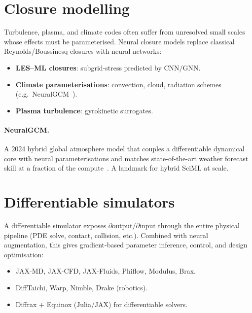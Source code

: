 \section{Closure modelling}
Turbulence, plasma, and climate codes often suffer from unresolved
small scales whose effects must be parameterised. Neural closure models
replace classical Reynolds/Boussinesq closures with neural networks:
\begin{itemize}
\item \textbf{LES--ML closures}: subgrid-stress predicted by CNN/GNN.
\item \textbf{Climate parameterisations}: convection, cloud, radiation
schemes (e.g.\ NeuralGCM~\cite{kochkov2024neuralgcm}).
\item \textbf{Plasma turbulence}: gyrokinetic surrogates.
\end{itemize}

\paragraph{NeuralGCM.}
A 2024 hybrid global atmosphere model that couples a differentiable
dynamical core with neural parameterisations and matches state-of-the-art
weather forecast skill at a fraction of the compute~\cite{kochkov2024neuralgcm}.
A landmark for hybrid SciML at scale.

\section{Differentiable simulators}
A differentiable simulator exposes $\partial \text{output}/\partial
\text{input}$ through the entire physical pipeline (PDE solve, contact,
collision, etc.). Combined with neural augmentation, this gives
gradient-based parameter inference, control, and design optimisation:
\begin{itemize}
\item JAX-MD, JAX-CFD, JAX-Fluids, Phiflow, Modulus, Brax.
\item DiffTaichi, Warp, Nimble, Drake (robotics).
\item Diffrax + Equinox (Julia/JAX) for differentiable solvers.
\end{itemize}

